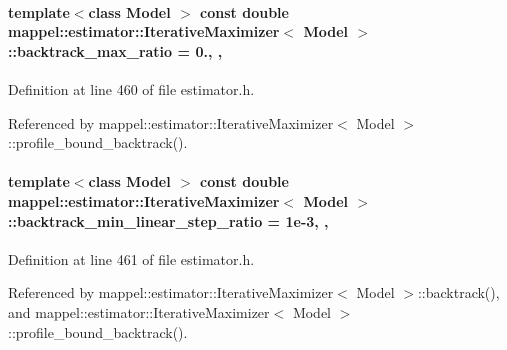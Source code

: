 \paragraph[{\texorpdfstring{backtrack\+\_\+max\+\_\+ratio}{backtrack_max_ratio}}]{\setlength{\rightskip}{0pt plus 5cm}template$<$class Model $>$ const double {\bf mappel\+::estimator\+::\+Iterative\+Maximizer}$<$ Model $>$\+::backtrack\+\_\+max\+\_\+ratio = 0.\hspace{0.3cm}{\ttfamily [static]}, {\ttfamily [protected]}, {\ttfamily [inherited]}}\hypertarget{classmappel_1_1estimator_1_1IterativeMaximizer_afa3dd68d0039939f43faf5f9508783b6}{}\label{classmappel_1_1estimator_1_1IterativeMaximizer_afa3dd68d0039939f43faf5f9508783b6}


Definition at line 460 of file estimator.\+h.



Referenced by mappel\+::estimator\+::\+Iterative\+Maximizer$<$ Model $>$\+::profile\+\_\+bound\+\_\+backtrack().

\paragraph[{\texorpdfstring{backtrack\+\_\+min\+\_\+linear\+\_\+step\+\_\+ratio}{backtrack_min_linear_step_ratio}}]{\setlength{\rightskip}{0pt plus 5cm}template$<$class Model $>$ const double {\bf mappel\+::estimator\+::\+Iterative\+Maximizer}$<$ Model $>$\+::backtrack\+\_\+min\+\_\+linear\+\_\+step\+\_\+ratio = 1e-\/3\hspace{0.3cm}{\ttfamily [static]}, {\ttfamily [protected]}, {\ttfamily [inherited]}}\hypertarget{classmappel_1_1estimator_1_1IterativeMaximizer_ac6f0771c4051b0405156bdc3e199278f}{}\label{classmappel_1_1estimator_1_1IterativeMaximizer_ac6f0771c4051b0405156bdc3e199278f}


Definition at line 461 of file estimator.\+h.



Referenced by mappel\+::estimator\+::\+Iterative\+Maximizer$<$ Model $>$\+::backtrack(), and mappel\+::estimator\+::\+Iterative\+Maximizer$<$ Model $>$\+::profile\+\_\+bound\+\_\+backtrack().

